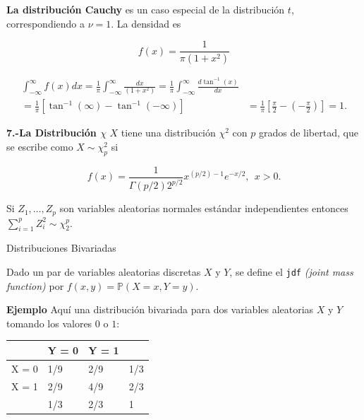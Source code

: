 \documentclass{article}\usepackage[]{graphicx}\usepackage[]{color}
\begin{document}
\textbf{La distribuci\'on Cauchy} es un caso especial de la distribuci\'on $t$, correspondiendo a $\nu = 1$. La densidad es

\[
f(x) = \frac{1}{\pi(1 + x^2)}
\]

\vspace{0.2cm}

\begin{align*}
\int_{-\infty}^{\infty}f(x)dx = \frac{1}{\pi}\int_{-\infty}^{\infty}\frac{dx}{(1 + x^2)} =  \frac{1}{\pi}\int_{-\infty}^{\infty}\frac{d\tan^{-1}(x)}{dx}\\ =
\frac{1}{\pi}[\tan^{-1}(\infty) - \tan^{-1}(-\infty)] 
&=  \frac{1}{\pi}[\frac{\pi}{2} - (-\frac{\pi}{2})] = 1.
\end{align*}

\vspace{0.5cm}

\textbf{7.-La Distribuci\'on $\chi$} $X$ tiene una distribuci\'on $\chi^2$ con $p$ grados de libertad, que se escribe como $X \sim \chi_{p}^2$ si

\[
f(x) = \frac{1}{\Gamma(p/2)2^{p/2}}x^{(p/2)-1}e^{-x/2}, \ \ x >0.
\]

\vspace{0.3cm}

Si $Z_1, \dots, Z_p $ son variables aleatorias normales est\'andar independientes entonces $\sum_{i = 1}^{p}Z_i^{2} \sim \chi_{2}^{p}.$


\vspace{0.8cm}

{\Large Distribuciones Bivariadas}

\vspace{0.5cm}

Dado un par de variables aleatorias discretas $X$ y $Y$, se define el \texttt{jdf} \textit{(joint mass function)} por  $f(x,y) = \mathbb{P}(X =x, Y=y)$.

\vspace{0.3cm}


\textbf{Ejemplo} Aqu\'i una distribuci\'on bivariada para dos variables aleatorias $X$ y $Y$ tomando los valores $0$ o $1 $:

\vspace{0.3cm}


\begin{table}[h]
\centering
\begin{tabular}{l|ll|l}
      & Y = 0 & Y = 1 &     \\
      \hline
X = 0 & 1/9   & 2/9   & 1/3 \\
X = 1 & 2/9   & 4/9   & 2/3 \\
\hline
      & 1/3   & 2/3   &  1  
\end{tabular}
\end{table}
\end{document}

